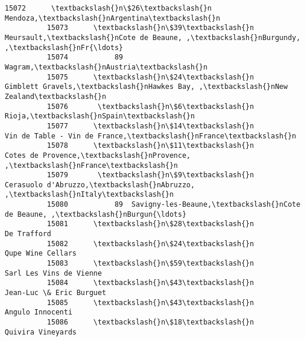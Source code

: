 \documentclass[11pt]{article}
\begin{document}
\begin{Verbatim}[commandchars=\\\{\}]
          15072      \textbackslash{}n\$26\textbackslash{}n                              Mendoza,\textbackslash{}nArgentina\textbackslash{}n   
          15073      \textbackslash{}n\$39\textbackslash{}n  Meursault,\textbackslash{}nCote de Beaune, ,\textbackslash{}nBurgundy, ,\textbackslash{}nFr{\ldots}   
          15074           89                                 Wagram,\textbackslash{}nAustria\textbackslash{}n   
          15075      \textbackslash{}n\$24\textbackslash{}n    Gimblett Gravels,\textbackslash{}nHawkes Bay, ,\textbackslash{}nNew Zealand\textbackslash{}n   
          15076       \textbackslash{}n\$6\textbackslash{}n                                    Rioja,\textbackslash{}nSpain\textbackslash{}n   
          15077      \textbackslash{}n\$14\textbackslash{}n            Vin de Table - Vin de France,\textbackslash{}nFrance\textbackslash{}n   
          15078      \textbackslash{}n\$11\textbackslash{}n          Cotes de Provence,\textbackslash{}nProvence, ,\textbackslash{}nFrance\textbackslash{}n   
          15079       \textbackslash{}n\$9\textbackslash{}n          Cerasuolo d'Abruzzo,\textbackslash{}nAbruzzo, ,\textbackslash{}nItaly\textbackslash{}n   
          15080           89  Savigny-les-Beaune,\textbackslash{}nCote de Beaune, ,\textbackslash{}nBurgun{\ldots}   
          15081      \textbackslash{}n\$28\textbackslash{}n                                        De Trafford   
          15082      \textbackslash{}n\$24\textbackslash{}n                                  Qupe Wine Cellars   
          15083      \textbackslash{}n\$59\textbackslash{}n                            Sarl Les Vins de Vienne   
          15084      \textbackslash{}n\$43\textbackslash{}n                            Jean-Luc \& Eric Burguet   
          15085      \textbackslash{}n\$43\textbackslash{}n                                   Angulo Innocenti   
          15086      \textbackslash{}n\$18\textbackslash{}n                                  Quivira Vineyards   
          

\end{Verbatim}
\end{document}
